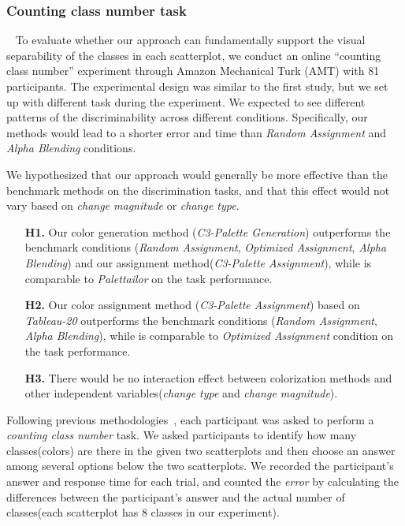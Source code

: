\subsubsection{Counting class number task}
\
\newline
To evaluate whether our approach can fundamentally support the visual separability of the classes in each scatterplot, we conduct an online ``counting class number'' experiment through Amazon Mechanical Turk (AMT) with 81 participants. The experimental design was similar to the first study, but we set up with different task during the experiment.
We expected to see different patterns of the discriminability across different conditions. Specifically, our methods would lead to a shorter error and time than \emph{Random Assignment} and \emph{Alpha Blending} conditions.

\vspace{.3em}
 We hypothesized that our approach would generally be more effective than the benchmark methods on the discrimination tasks, and that this effect would not vary based on \emph{change magnitude} or \emph{change type}.
\begin{itemize}[noitemsep]
\setlength{\itemsep}{5pt}
    \item[\textbf{H1.}] Our color generation method (\emph{C3-Palette Generation}) outperforms the benchmark conditions (\emph{Random Assignment}, \emph{Optimized Assignment}, \emph{Alpha Blending}) and our assignment method(\emph{C3-Palette Assignment}), while is comparable to  \emph{Palettailor} on the task performance.

    \item [\textbf{H2.}] Our color assignment method (\emph{C3-Palette Assignment}) based on \emph{Tableau-20} outperforms the benchmark conditions (\emph{Random Assignment}, \emph{Alpha Blending}), while is comparable to \emph{Optimized Assignment} condition on the task performance.

    \item [\textbf{H3.}] There would be no interaction effect between colorization methods and other independent variables(\emph{change type} and \emph{change magnitude}).
\end{itemize}

\vspace{.3em}
Following previous methodologies~\cite{Wang2018, Lu21}, each participant was asked to perform a \emph{counting class number} task.  We asked participants to identify how many classes(colors) are there in the given two scatterplots and then choose an answer among several options below the two scatterplots. We recorded the participant's answer and response time for each trial, and counted the \emph{error}  by calculating the differences between the participant's answer and the actual number of classes(each scatterplot has $8$ classes in our experiment). %


